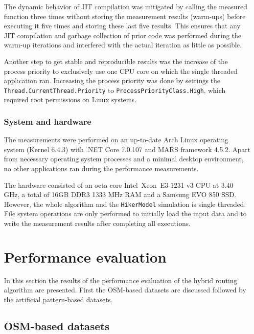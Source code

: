			The dynamic behavior of JIT compilation was mitigated by calling the measured function three times without storing the measurement results (warm-ups) before executing it five times and storing these last five results.
			This ensures that any JIT compilation and garbage collection of prior code was performed during the warm-up iterations and interfered with the actual iteration as little as possible.
			
			Another step to get stable and reproducible results was the increase of the process priority to exclusively use one CPU core on which the single threaded application ran.
			Increasing the process priority was done by settings the \texttt{Thread.CurrentThread.Priority} to \texttt{ProcessPriorityClass.High}, which required root permissions on Linux systems.
		
		\subsubsection{System and hardware}
		
			The measurements were performed on an up-to-date Arch Linux operating system (Kernel 6.4.3) with .NET Core 7.0.107 and MARS framework 4.5.2.
			Apart from necessary operating system processes and a minimal desktop environment, no other applications ran during the performance measurements.
			
			The hardware consisted of an octa core Intel\textregistered\ Xeon\textregistered\ E3-1231 v3 CPU at 3.40 GHz, a total of 16GB DDR3 1333 MHz RAM and a Samsung EVO 850 SSD.
			However, the whole algorithm and the \texttt{HikerModel} simulation is single threaded.
			File system operations are only performed to initially load the input data and to write the measurement results after completing all executions.
	
\section{Performance evaluation}

	In this section the results of the performance evaluation of the hybrid routing algorithm are presented.
	First the OSM-based datasets are discussed followed by the artificial pattern-based datasets.

	\subsection{OSM-based datasets}
		
